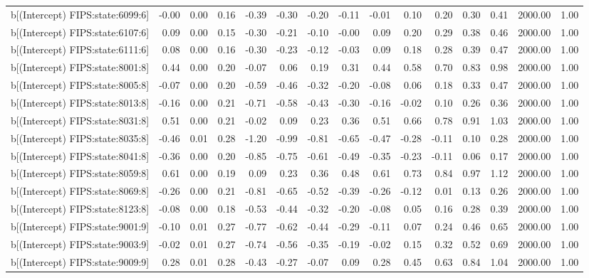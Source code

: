 \begin{table}[ht]
\begin{tabular}{rrrrrrrrrrrrrrr}
  b[(Intercept) FIPS:state:6099:6] & -0.00 & 0.00 & 0.16 & -0.39 & -0.30 & -0.20 & -0.11 & -0.01 & 0.10 & 0.20 & 0.30 & 0.41 & 2000.00 & 1.00 \\ 
  b[(Intercept) FIPS:state:6107:6] & 0.09 & 0.00 & 0.15 & -0.30 & -0.21 & -0.10 & -0.00 & 0.09 & 0.20 & 0.29 & 0.38 & 0.46 & 2000.00 & 1.00 \\ 
  b[(Intercept) FIPS:state:6111:6] & 0.08 & 0.00 & 0.16 & -0.30 & -0.23 & -0.12 & -0.03 & 0.09 & 0.18 & 0.28 & 0.39 & 0.47 & 2000.00 & 1.00 \\ 
  b[(Intercept) FIPS:state:8001:8] & 0.44 & 0.00 & 0.20 & -0.07 & 0.06 & 0.19 & 0.31 & 0.44 & 0.58 & 0.70 & 0.83 & 0.98 & 2000.00 & 1.00 \\ 
  b[(Intercept) FIPS:state:8005:8] & -0.07 & 0.00 & 0.20 & -0.59 & -0.46 & -0.32 & -0.20 & -0.08 & 0.06 & 0.18 & 0.33 & 0.47 & 2000.00 & 1.00 \\ 
  b[(Intercept) FIPS:state:8013:8] & -0.16 & 0.00 & 0.21 & -0.71 & -0.58 & -0.43 & -0.30 & -0.16 & -0.02 & 0.10 & 0.26 & 0.36 & 2000.00 & 1.00 \\ 
  b[(Intercept) FIPS:state:8031:8] & 0.51 & 0.00 & 0.21 & -0.02 & 0.09 & 0.23 & 0.36 & 0.51 & 0.66 & 0.78 & 0.91 & 1.03 & 2000.00 & 1.00 \\ 
  b[(Intercept) FIPS:state:8035:8] & -0.46 & 0.01 & 0.28 & -1.20 & -0.99 & -0.81 & -0.65 & -0.47 & -0.28 & -0.11 & 0.10 & 0.28 & 2000.00 & 1.00 \\ 
  b[(Intercept) FIPS:state:8041:8] & -0.36 & 0.00 & 0.20 & -0.85 & -0.75 & -0.61 & -0.49 & -0.35 & -0.23 & -0.11 & 0.06 & 0.17 & 2000.00 & 1.00 \\ 
  b[(Intercept) FIPS:state:8059:8] & 0.61 & 0.00 & 0.19 & 0.09 & 0.23 & 0.36 & 0.48 & 0.61 & 0.73 & 0.84 & 0.97 & 1.12 & 2000.00 & 1.00 \\ 
  b[(Intercept) FIPS:state:8069:8] & -0.26 & 0.00 & 0.21 & -0.81 & -0.65 & -0.52 & -0.39 & -0.26 & -0.12 & 0.01 & 0.13 & 0.26 & 2000.00 & 1.00 \\ 
  b[(Intercept) FIPS:state:8123:8] & -0.08 & 0.00 & 0.18 & -0.53 & -0.44 & -0.32 & -0.20 & -0.08 & 0.05 & 0.16 & 0.28 & 0.39 & 2000.00 & 1.00 \\ 
  b[(Intercept) FIPS:state:9001:9] & -0.10 & 0.01 & 0.27 & -0.77 & -0.62 & -0.44 & -0.29 & -0.11 & 0.07 & 0.24 & 0.46 & 0.65 & 2000.00 & 1.00 \\ 
  b[(Intercept) FIPS:state:9003:9] & -0.02 & 0.01 & 0.27 & -0.74 & -0.56 & -0.35 & -0.19 & -0.02 & 0.15 & 0.32 & 0.52 & 0.69 & 2000.00 & 1.00 \\ 
  b[(Intercept) FIPS:state:9009:9] & 0.28 & 0.01 & 0.28 & -0.43 & -0.27 & -0.07 & 0.09 & 0.28 & 0.45 & 0.63 & 0.84 & 1.04 & 2000.00 & 1.00 \\ 

\end{tabular}
\end{table}
